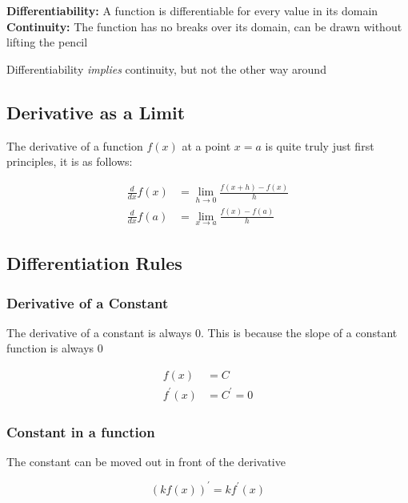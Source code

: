 \documentclass[12pt]{article}
\begin{document}
        \noindent\textbf{Differentiability:} A function is differentiable for every value in its domain \\
        \noindent\textbf{Continuity:} The function has no breaks over its domain, can be drawn without lifting the pencil

        \noindent Differentiability \textit{implies} continuity, but not the other way around

        \subsection{Derivative as a Limit}

        The derivative of a function $f(x)$ at a point $x = a$ is quite truly just first principles, it is as follows:

        \[
            \begin{aligned}
                \frac{d}{dx} f(x) &= \lim_{h \to 0} \frac{f(x + h) - f(x)}{h} \\
                \frac{d}{dx} f(a) &= \lim_{x \to a} \frac{f(x) - f(a)}{h}
            \end{aligned}
        \]

        \subsection{Differentiation Rules}

        \subsubsection{Derivative of a Constant}

        The derivative of a constant is always $0$. This is because the slope of a constant function is always $0$

        \[
            \begin{aligned}
                f(x) &= C \\
                f^{\prime}(x) &= C^{\prime} = 0
            \end{aligned}    
        \]

        \subsubsection{Constant in a function}

        The constant can be moved out in front of the derivative

        \[
            (k f(x))^{\prime} = k f^{\prime}(x)
        \]
\end{document}
